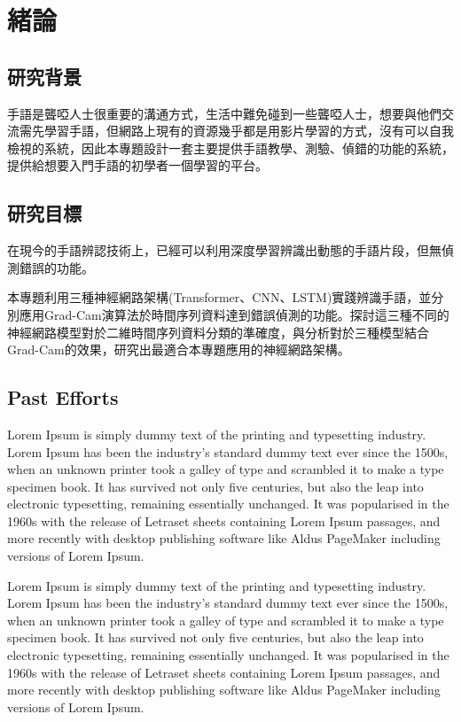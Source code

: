 \documentclass[12pt,a4paper]{report}
\begin{document}
\begin{CJK*}{UTF8}{bkai}
    \vspace{2cm}
    \begin{center}
    \end{center}


    \newpage

    \chapter{緒論}

    \section{研究背景}
    \par
    手語是聾啞人士很重要的溝通方式，生活中難免碰到一些聾啞人士，想要與他們交流需先學習手語，但網路上現有的資源幾乎都是用影片學習的方式，沒有可以自我檢視的系統，因此本專題設計一套主要提供手語教學、測驗、偵錯的功能的系統，提供給想要入門手語的初學者一個學習的平台。

    \section{研究目標}
    \par
    在現今的手語辨認技術上，已經可以利用深度學習辨識出動態的手語片段，但無偵測錯誤的功能。
    \par
    本專題利用三種神經網路架構(Transformer、CNN、LSTM)實踐辨識手語，並分別應用Grad-Cam演算法於時間序列資料達到錯誤偵測的功能。探討這三種不同的神經網路模型對於二維時間序列資料分類的準確度，與分析對於三種模型結合Grad-Cam的效果，研究出最適合本專題應用的神經網路架構。


    \section{Past Efforts}
    Lorem Ipsum is simply dummy text of the printing and typesetting industry. Lorem Ipsum has been the industry's standard dummy text ever since the 1500s, when an unknown printer took a galley of type and scrambled it to make a type specimen book. It has survived not only five centuries, but also the leap into electronic typesetting, remaining essentially unchanged. It was popularised in the 1960s with the release of Letraset sheets containing Lorem Ipsum passages, and more recently with desktop publishing software like Aldus PageMaker including versions of Lorem Ipsum.

    Lorem Ipsum is simply dummy text of the printing and typesetting industry. Lorem Ipsum has been the industry's standard dummy text ever since the 1500s, when an unknown printer took a galley of type and scrambled it to make a type specimen book. It has survived not only five centuries, but also the leap into electronic typesetting, remaining essentially unchanged. It was popularised in the 1960s with the release of Letraset sheets containing Lorem Ipsum passages, and more recently with desktop publishing software like Aldus PageMaker including versions of Lorem Ipsum.







\end{CJK*}
\end{document}
